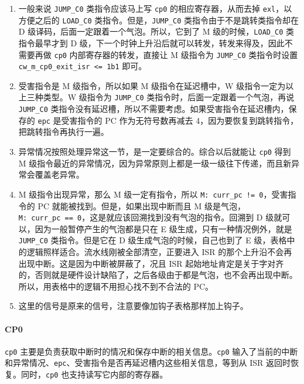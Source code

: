 \documentclass[12pt,AutoFakeBold,AutoFakeSlant]{article}
\providecommand{\tightlist}{%
  \setlength{\itemsep}{0pt}\setlength{\parskip}{0pt}}
\begin{document}
\begin{enumerate}
\def\labelenumi{\arabic{enumi}.}
\tightlist
\item
  一般来说 \texttt{JUMP\_C0} 类指令应该马上写 \texttt{cp0}
  的相应寄存器，从而去掉 \texttt{exl}，以方便之后的 \texttt{LOAD\_C0}
  类指令。但是，\texttt{JUMP\_C0} 类指令由于不是跳转类指令却在 D
  级译码，后面一定跟着一个气泡。所以，它到了 M
  级的时候，\texttt{LOAD\_C0} 类指令最早才到 D
  级，下一个时钟上升沿后就可以转发，转发来得及，因此不需要再做
  \texttt{cp0} 内部寄存器的转发，直接让 M 级指令为 \texttt{JUMP\_C0}
  类指令时设置
  \texttt{cw\_m\_cp0\_exit\_isr\ \textless{}=\ 1\textquotesingle{}b1}
  即可。
\item
  受害指令是 M 级指令，所以如果 M 级指令在延迟槽中，W
  级指令一定为以上三种类型。W 级指令为 \texttt{JUMP\_C0}
  类指令时，后面一定跟着一个气泡，再说 \texttt{JUMP\_C0}
  类指令没有延迟槽，所以不需要考虑。如果受害指令在延迟槽内，保存的
  \texttt{epc} 是受害指令的 PC 作为无符号数再减去
  4，因为要恢复到跳转指令，把跳转指令再执行一遍。
\item
  异常情况按照处理异常这一节，是一定要综合的。综合以后就能让
  \texttt{cp0} 得到 M
  级指令最近的异常情况，因为异常原则上都是一级一级往下传递，而且新异常会覆盖老异常。
\item
  M 级指令出现异常，那么 M 级一定有指令，所以
  \texttt{M:\ curr\_pc\ !=\ 0}，受害指令的 PC
  就能被找到。但是，如果出现中断而且 M
  级是气泡，\texttt{M:\ curr\_pc\ ==\ 0}，这是就应该回溯找到没有气泡的指令。回溯到
  D 级就可以，因为一般暂停产生的气泡都是只在 E
  级生成，只有一种情况例外，就是 \texttt{JUMP\_C0} 类指令。但是它在 D
  级生成气泡的时候，自己也到了 E
  级，表格中的逻辑照样适合。流水线刚被全部清空，正要进入 ISR
  的那个上升沿不会再出现中断。这是因为中断被屏蔽了，况且 ISR
  起始地址肯定是关于字对齐的，否则就是硬件设计缺陷了，之后各级由于都是气泡，也不会再出现中断。所以，用表格中的逻辑不用担心找不到不合法的
  PC。
\item
  这里的信号是原来的信号，注意要像加钩子表格那样加上钩子。
\end{enumerate}

\hypertarget{cp0-1}{%
\paragraph{CP0}\label{cp0-1}}

\texttt{cp0}
主要是负责获取中断时的情况和保存中断的相关信息。\texttt{cp0}
输入了当前的中断和异常情况、\texttt{epc}、受害指令是否再延迟槽内这些相关信息，等到从
ISR 返回时恢复。同时，\texttt{cp0} 也支持读写它内部的寄存器。
\end{document}
